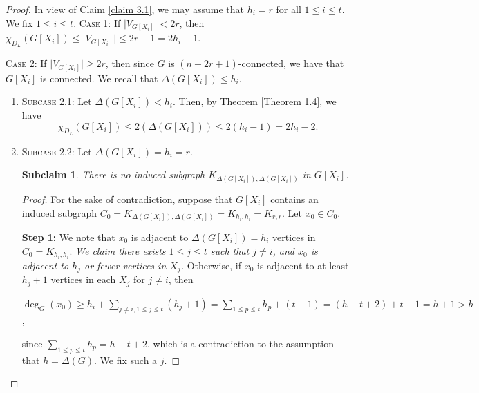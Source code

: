 \documentclass[12pt,reqno,a4paper]{amsart}
\theoremstyle{definition}
\newtheorem{subclaim}[defn]{Subclaim}
\begin{document}
\begin{proof}
In view of Claim \ref{claim 3.1}, we may assume that $h_{i}=r$ for all $1\leq i\leq t$.
We fix $1\leq i\leq t$.
\noindent \textsc{Case 1:}  If $\vert V_{G[X_{i}]}\vert< 2r$, then
$\chi_{D_{L}}(G[X_{i}])\leq \vert V_{G[X_{i}]}\vert \leq 2r-1= 2h_{i}-1.$ 

\noindent \textsc{Case 2:} If $\vert V_{G[X_{i}]}\vert\geq 2r$, then since $G$ is $(n-2r+1)$-connected, we have that $G[X_{i}]$ is connected.
We recall that $\Delta(G[X_{i}])\leq h_{i}$.

\vspace{2mm}
\begin{enumerate}
    \item[] \textsc{Subcase 2.1:} Let $\Delta(G[X_{i}])< h_{i}$.
Then, by Theorem \ref{Theorem 1.4}, we have
\[\chi_{D_{L}}(G[X_{i}])\leq 2(\Delta (G[X_{i}]))\leq 2(h_{i}-1)=2h_{i}-2.\]
    \item[] \textsc{Subcase 2.2:}
    Let $\Delta(G[X_{i}])= h_{i}=r$.

\begin{subclaim}\label{Subclaim 3.3}
{\em There is no induced subgraph $K_{\Delta(G[X_{i}]), \Delta(G[X_{i}])}$ in $G[X_{i}]$.}    
\end{subclaim}

\begin{proof}
For the sake of contradiction, suppose that $G[X_{i}]$ contains an induced subgraph $C_{0}=K_{\Delta(G[X_{i}]), \Delta(G[X_{i}])}=K_{h_{i},h_{i}}=K_{r,r}$. Let $x_{0}\in C_{0}$. 
\vspace{2mm}

\textbf{Step 1:} 
We note that $x_{0}$ is adjacent to  $\Delta(G[X_{i}])=h_{i}$ vertices in $C_{0}=K_{h_{i}, h_{i}}$.
{\em We claim there exists $1\leq j\leq t$ such that $j\neq i$, and $x_{0}$ is adjacent to $h_{j}$ or fewer vertices in $X_{j}$.} 
Otherwise, if $x_{0}$ is adjacent to at least $h_{j}+1$ vertices in each $X_{j}$ for $j\neq i$, then 

\begin{center}
$\deg_{G}(x_{0})\geq h_{i}+\sum_{j\neq i, 1\leq j\leq t}(h_{j}+1)=\sum_{1\leq p\leq t}h_{p}+(t-1)=(h-t+2)+t-1=h+1>h$,     
\end{center}

since $\sum_{1\leq p\leq t}h_{p}=h-t+2$, which is a contradiction to the assumption that $h=\Delta(G)$. We fix such a $j$. 
\vspace{2mm}


\end{proof}
\end{enumerate}
\end{proof}
\end{document}
